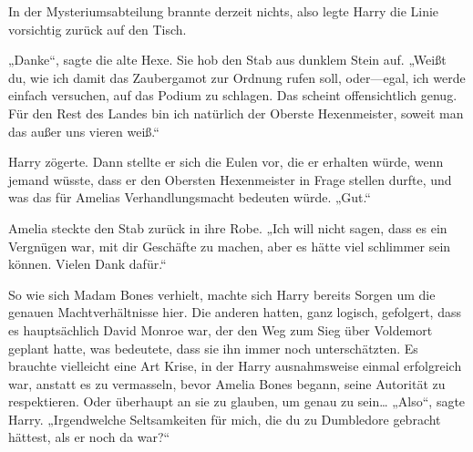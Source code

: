 In der Mysteriumsabteilung brannte derzeit nichts, also legte Harry die Linie vorsichtig zurück auf den Tisch.

„Danke“, sagte die alte Hexe. Sie hob den Stab aus dunklem Stein auf. „Weißt du, wie ich damit das Zaubergamot zur Ordnung rufen soll, oder—egal, ich werde einfach versuchen, auf das Podium zu schlagen. Das scheint offensichtlich genug. Für den Rest des Landes bin ich natürlich der Oberste Hexenmeister, soweit man das außer uns vieren weiß.“

Harry zögerte. Dann stellte er sich die Eulen vor, die er erhalten würde, wenn jemand wüsste, dass er den Obersten Hexenmeister in Frage stellen durfte, und was das für Amelias Verhandlungsmacht bedeuten würde.
„Gut.“

Amelia steckte den Stab zurück in ihre Robe.
„Ich will nicht sagen, dass es ein Vergnügen war, mit dir Geschäfte zu machen, aber es hätte viel schlimmer sein können. Vielen Dank dafür.“

So wie sich Madam Bones verhielt, machte sich Harry bereits Sorgen um die genauen Machtverhältnisse hier. Die anderen hatten, ganz logisch, gefolgert, dass es hauptsächlich David Monroe war, der den Weg zum Sieg über Voldemort geplant hatte, was bedeutete, dass sie ihn immer noch unterschätzten. Es brauchte vielleicht eine Art Krise, in der Harry ausnahmsweise einmal erfolgreich war, anstatt es zu vermasseln, bevor Amelia Bones begann, seine Autorität zu respektieren. Oder überhaupt an sie zu glauben, um genau zu sein…
„Also“, sagte Harry. „Irgendwelche Seltsamkeiten für mich, die du zu Dumbledore gebracht hättest, als er noch da war?“

